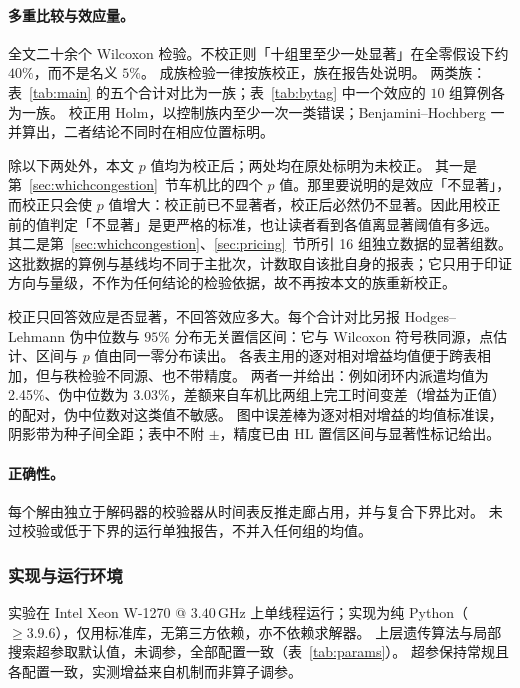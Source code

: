 \documentclass[manuscript,screen,review]{acmart}
\newcommand{\NCases}{10}
\newcommand{\GainProbeLoop}{2.45\%}      %
\newcommand{\HLProbeLoop}{3.03\%}
\newcommand{\MatrixCells}{16}
\begin{document}
\paragraph{多重比较与效应量。}
全文二十余个 Wilcoxon 检验。不校正则「十组里至少一处显著」在全零假设下约 $40\%$，而不是名义 $5\%$。
成族检验一律按族校正，族在报告处说明。
两类族：表~\ref{tab:main} 的五个合计对比为一族；表~\ref{tab:bytag} 中一个效应的 $\NCases$ 组算例各为一族。
校正用 Holm，以控制族内至少一次一类错误；Benjamini--Hochberg 一并算出，二者结论不同时在相应位置标明。

除以下两处外，本文 $p$ 值均为校正后；两处均在原处标明为未校正。
其一是第~\ref{sec:whichcongestion}~节车机比的四个 $p$ 值。那里要说明的是效应「不显著」，而校正只会使 $p$ 值增大：校正前已不显著者，校正后必然仍不显著。因此用校正前的值判定「不显著」是更严格的标准，也让读者看到各值离显著阈值有多远。
其二是第~\ref{sec:whichcongestion}、\ref{sec:pricing}~节所引 \MatrixCells{} 组独立数据的显著组数。这批数据的算例与基线均不同于主批次，计数取自该批自身的报表；它只用于印证方向与量级，不作为任何结论的检验依据，故不再按本文的族重新校正。

校正只回答效应是否显著，不回答效应多大。每个合计对比另报 Hodges--Lehmann 伪中位数与 $95\%$ 分布无关置信区间：它与 Wilcoxon 符号秩同源，点估计、区间与 $p$ 值由同一零分布读出。
各表主用的逐对相对增益均值便于跨表相加，但与秩检验不同源、也不带精度。
两者一并给出：例如闭环内派遣均值为 \GainProbeLoop{}、伪中位数为 \HLProbeLoop{}，差额来自车机比两组上完工时间变差（增益为正值）的配对，伪中位数对这类值不敏感。
图中误差棒为逐对相对增益的均值标准误，阴影带为种子间全距；表中不附 $\pm$，精度已由 HL 置信区间与显著性标记给出。

\paragraph{正确性。}
每个解由独立于解码器的校验器从时间表反推走廊占用，并与复合下界比对。
未过校验或低于下界的运行单独报告，不并入任何组的均值。

\subsubsection{实现与运行环境}
\label{sec:impl}
实验在 Intel Xeon W-1270 @ $3.40$\,GHz 上单线程运行；实现为纯 Python（$\ge 3.9.6$），仅用标准库，无第三方依赖，亦不依赖求解器。
上层遗传算法与局部搜索超参取默认值，未调参，全部配置一致（表~\ref{tab:params}）。
超参保持常规且各配置一致，实测增益来自机制而非算子调参。
\end{document}
